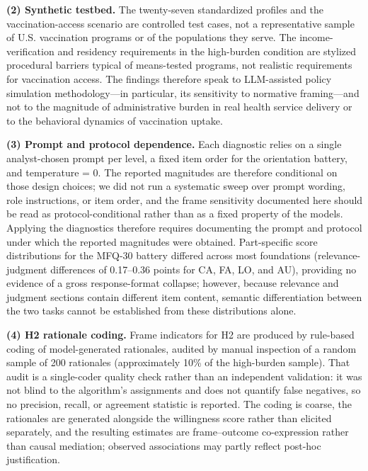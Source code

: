 \documentclass[12pt,a4paper]{article}
\begin{document}
\textbf{(2) Synthetic testbed.} The twenty-seven standardized profiles and the vaccination-access scenario are controlled test cases, not a representative sample of U.S. vaccination programs or of the populations they serve. The income-verification and residency requirements in the high-burden condition are stylized procedural barriers typical of means-tested programs, not realistic requirements for vaccination access. The findings therefore speak to LLM-assisted policy simulation methodology---in particular, its sensitivity to normative framing---and not to the magnitude of administrative burden in real health service delivery or to the behavioral dynamics of vaccination uptake.

\textbf{(3) Prompt and protocol dependence.} Each diagnostic relies on a single analyst-chosen prompt per level, a fixed item order for the orientation battery, and temperature = 0. The reported magnitudes are therefore conditional on those design choices; we did not run a systematic sweep over prompt wording, role instructions, or item order, and the frame sensitivity documented here should be read as protocol-conditional rather than as a fixed property of the models. Applying the diagnostics therefore requires documenting the prompt and protocol under which the reported magnitudes were obtained. Part-specific score distributions for the MFQ-30 battery differed across most foundations (relevance-judgment differences of 0.17--0.36 points for CA, FA, LO, and AU), providing no evidence of a gross response-format collapse; however, because relevance and judgment sections contain different item content, semantic differentiation between the two tasks cannot be established from these distributions alone.

\textbf{(4) H2 rationale coding.} Frame indicators for H2 are produced by rule-based coding of model-generated rationales, audited by manual inspection of a random sample of 200 rationales (approximately 10\% of the high-burden sample). That audit is a single-coder quality check rather than an independent validation: it was not blind to the algorithm's assignments and does not quantify false negatives, so no precision, recall, or agreement statistic is reported. The coding is coarse, the rationales are generated alongside the willingness score rather than elicited separately, and the resulting estimates are frame--outcome co-expression rather than causal mediation; observed associations may partly reflect post-hoc justification.
\end{document}
